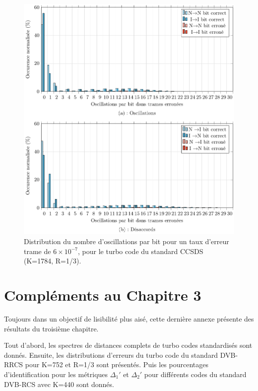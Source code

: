 \begin{figure}[!ht]
	\centering
	\includegraphics[width=\textwidth]{main/ch2_fig/tikz/d_ccsds_610-7.pdf}
	\caption{Distribution du nombre d'oscillations par bit pour un taux d'erreur trame de $6\times10^{-7}$, pour le turbo code du standard CCSDS (K=1784, R=1/3).\label{fig:d2_ccsds}}
\end{figure}


\chapter{Compléments au Chapitre 3}\label{sec:ann3}
Toujours dans un objectif de lisibilité plus aisé, cette dernière annexe présente des résultats du troisième chapitre.

Tout d'abord, les spectres de distances complets de turbo codes standardisés sont donnés. Ensuite, les distributions 
d'erreurs du turbo code du standard DVB-RRCS pour K=752 et R=1/3 sont présentés. Puis les pourcentages d'identification pour les métriques 
$\Delta_1'$ et $\Delta_2'$ pour différents codes du standard DVB-RCS avec K=440 sont donnés. 

